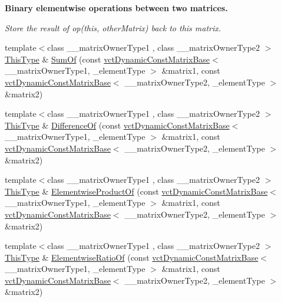\begin{Indent}{\bf Binary elementwise operations between two matrices.}\par
{\em Store the result of op(this, other\+Matrix) back to this matrix. }\begin{DoxyCompactItemize}
\item 
{\footnotesize template$<$class \+\_\+\+\_\+matrix\+Owner\+Type1 , class \+\_\+\+\_\+matrix\+Owner\+Type2 $>$ }\\\hyperlink{classvct_dynamic_const_matrix_base_ac4ff48cbe4d9de3fdef5a02447ffb9db}{This\+Type} \& \hyperlink{classvct_dynamic_matrix_base_a766669667dc485fc1692d7acaa5e6111}{Sum\+Of} (const \hyperlink{classvct_dynamic_const_matrix_base}{vct\+Dynamic\+Const\+Matrix\+Base}$<$ \+\_\+\+\_\+matrix\+Owner\+Type1, \+\_\+element\+Type $>$ \&matrix1, const \hyperlink{classvct_dynamic_const_matrix_base}{vct\+Dynamic\+Const\+Matrix\+Base}$<$ \+\_\+\+\_\+matrix\+Owner\+Type2, \+\_\+element\+Type $>$ \&matrix2)
\item 
{\footnotesize template$<$class \+\_\+\+\_\+matrix\+Owner\+Type1 , class \+\_\+\+\_\+matrix\+Owner\+Type2 $>$ }\\\hyperlink{classvct_dynamic_const_matrix_base_ac4ff48cbe4d9de3fdef5a02447ffb9db}{This\+Type} \& \hyperlink{classvct_dynamic_matrix_base_afc79dd9a0bf3514f5b0abd2fee2011a1}{Difference\+Of} (const \hyperlink{classvct_dynamic_const_matrix_base}{vct\+Dynamic\+Const\+Matrix\+Base}$<$ \+\_\+\+\_\+matrix\+Owner\+Type1, \+\_\+element\+Type $>$ \&matrix1, const \hyperlink{classvct_dynamic_const_matrix_base}{vct\+Dynamic\+Const\+Matrix\+Base}$<$ \+\_\+\+\_\+matrix\+Owner\+Type2, \+\_\+element\+Type $>$ \&matrix2)
\item 
{\footnotesize template$<$class \+\_\+\+\_\+matrix\+Owner\+Type1 , class \+\_\+\+\_\+matrix\+Owner\+Type2 $>$ }\\\hyperlink{classvct_dynamic_const_matrix_base_ac4ff48cbe4d9de3fdef5a02447ffb9db}{This\+Type} \& \hyperlink{classvct_dynamic_matrix_base_a45e0a6a1edf0bf79a772341ca21638a1}{Elementwise\+Product\+Of} (const \hyperlink{classvct_dynamic_const_matrix_base}{vct\+Dynamic\+Const\+Matrix\+Base}$<$ \+\_\+\+\_\+matrix\+Owner\+Type1, \+\_\+element\+Type $>$ \&matrix1, const \hyperlink{classvct_dynamic_const_matrix_base}{vct\+Dynamic\+Const\+Matrix\+Base}$<$ \+\_\+\+\_\+matrix\+Owner\+Type2, \+\_\+element\+Type $>$ \&matrix2)
\item 
{\footnotesize template$<$class \+\_\+\+\_\+matrix\+Owner\+Type1 , class \+\_\+\+\_\+matrix\+Owner\+Type2 $>$ }\\\hyperlink{classvct_dynamic_const_matrix_base_ac4ff48cbe4d9de3fdef5a02447ffb9db}{This\+Type} \& \hyperlink{classvct_dynamic_matrix_base_a8f5bee5a4a265e230ef7b050d0513e67}{Elementwise\+Ratio\+Of} (const \hyperlink{classvct_dynamic_const_matrix_base}{vct\+Dynamic\+Const\+Matrix\+Base}$<$ \+\_\+\+\_\+matrix\+Owner\+Type1, \+\_\+element\+Type $>$ \&matrix1, const \hyperlink{classvct_dynamic_const_matrix_base}{vct\+Dynamic\+Const\+Matrix\+Base}$<$ \+\_\+\+\_\+matrix\+Owner\+Type2, \+\_\+element\+Type $>$ \&matrix2)

\end{DoxyCompactItemize}
\end{Indent}
